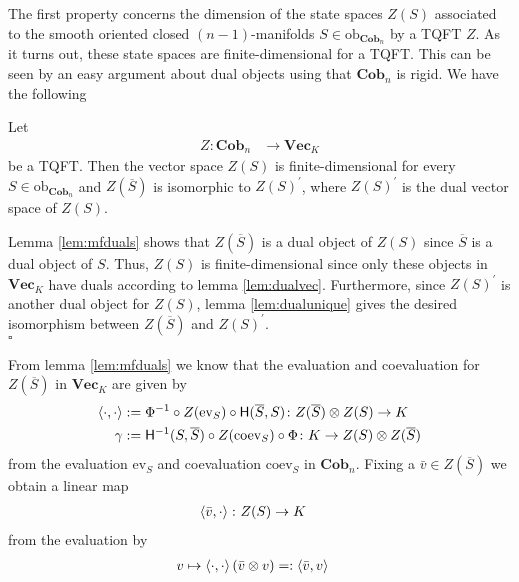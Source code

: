 \nocite{0a816f4c}
The first property concerns the dimension of the state spaces $Z(S)$ associated to the smooth oriented closed $(n-1)$-manifolds $S \in \mathrm{ob}_{\mathbf{Cob}_{n}}$ by a TQFT $Z$. As it turns out, these state spaces are finite-dimensional for a TQFT. This can be seen by an easy argument about dual objects using that $\mathbf{Cob}_{n}$ is rigid. We have the following
\\
\begin{cor}
\label{cor:dimstsp}
Let
\begin{align*}
  Z
  \colon
  \mathbf{Cob}_{n}
  &\to
  \mathbf{Vec}_{K}
\end{align*}
be a TQFT. Then the vector space $Z(S)$ is finite-dimensional for every $S \in \mathrm{ob}_{\mathbf{Cob}_{n}}$ and $Z(\overline{S})$ is isomorphic to $Z(S)^{\prime}$, where $Z(S)^{\prime}$ is the dual vector space of $Z(S)$.
\end{cor}
\begin{prf}
Lemma \ref{lem:mfduals} shows that $Z(\overline{S})$ is a dual object of $Z(S)$ since $\overline{S}$ is a dual object of $S$. Thus, $Z(S)$ is finite-dimensional since only these objects in $\mathbf{Vec}_{K}$ have duals according to lemma \ref{lem:dualvec}. Furthermore, since $Z(S)^{\prime}$ is another dual object for $Z(S)$, lemma \ref{lem:dualunique} gives the desired isomorphism between $Z(\overline{S})$ and $Z(S)^{\prime}$.
\\
\phantom{proven}
\hfill
$\square$
\end{prf}
From lemma \ref{lem:mfduals} we know that the evaluation and coevaluation for $Z(\overline{S})$ in $\mathbf{Vec}_{K}$ are given by
\begin{align*}
  \Braket{\cdot,\cdot}
  &:=
  \Phi^{-1}
  \circ
  Z(\mathrm{ev}_{S})
  \circ
  \mathsf{H}(\overline{S},S)
  \colon
  Z(\overline{S})
  \otimes
  Z(S)
  \to
  K
  \\
  \gamma
  &:=
  \mathsf{H}^{-1}(S,\overline{S})
  \circ
  Z(\mathrm{coev}_{S})
  \circ
  \Phi
  \colon
  K
  \to
  Z(S)
  \otimes
  Z(\overline{S})
\end{align*}
from the evaluation $\mathrm{ev}_{S}$ and coevaluation $\mathrm{coev}_{S}$ in $\mathbf{Cob}_{n}$. Fixing a $\bar{v} \in Z(\overline{S})$ we obtain a linear map 
\begin{align*}
  \Braket{\bar{v},\cdot}
  \colon
  Z(S)
  &\to
  K
\end{align*}
from the evaluation by
\begin{align*}
  v
  \mapsto
  \Braket{\cdot,\cdot}(\bar{v} \otimes v)
  &=:
  \Braket{\bar{v},v}
\end{align*}
